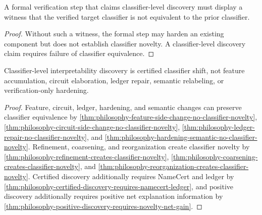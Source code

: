 \begin{theorem}
\label{thm:philosophy-formal-classifier-discovery-requires-witness}
A formal verification step that claims classifier-level discovery must
display a witness that the verified target classifier is not equivalent
to the prior classifier.
\end{theorem}
\begin{proof}
Without such a witness, the formal step may harden an existing component
but does not establish classifier novelty. A classifier-level discovery
claim requires failure of classifier equivalence.
\end{proof}

\begin{theorem}
\label{thm:philosophy-interpretability-classifier-novelty-theorem}
Classifier-level interpretability discovery is certified classifier
shift, not feature accumulation, circuit elaboration, ledger repair,
semantic relabeling, or verification-only hardening.
\end{theorem}
\begin{proof}
Feature, circuit, ledger, hardening, and semantic changes can preserve
classifier equivalence by
\autoref{thm:philosophy-feature-side-change-no-classifier-novelty},
\autoref{thm:philosophy-circuit-side-change-no-classifier-novelty},
\autoref{thm:philosophy-ledger-repair-no-classifier-novelty}, and
\autoref{thm:philosophy-hardening-semantic-no-classifier-novelty}.
Refinement, coarsening, and reorganization create classifier novelty by
\autoref{thm:philosophy-refinement-creates-classifier-novelty},
\autoref{thm:philosophy-coarsening-creates-classifier-novelty}, and
\autoref{thm:philosophy-reorganization-creates-classifier-novelty}.
Certified discovery additionally requires NameCert and ledger by
\autoref{thm:philosophy-certified-discovery-requires-namecert-ledger},
and positive discovery additionally requires positive net explanation
information by
\autoref{thm:philosophy-positive-discovery-requires-novelty-net-gain}.
\end{proof}
